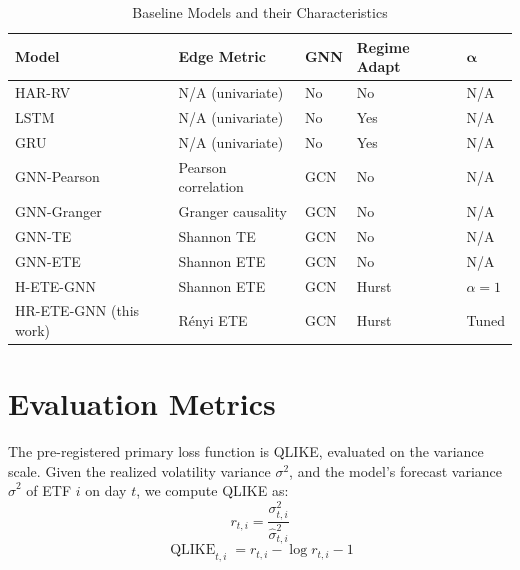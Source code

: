 \documentclass[12pt,oneside]{report}
\DeclareMathOperator{\QLIKE}{QLIKE}
\begin{document}
\begin{table}[htbp]
  \centering
  \singlespacing
  \caption{Baseline Models and their Characteristics}\label{tab:baselines}
  \small
  \begin{tabular}{lllll}
    \toprule
    \textbf{Model} & \textbf{Edge Metric} & \textbf{GNN} & \textbf{Regime Adapt} & $\boldsymbol{\alpha}$ \\
    \midrule
    HAR-RV                       & N/A (univariate)                     & No                  & No    & N/A \\
    LSTM \cite{hochreiter1997}   & N/A (univariate)                     & No                  & Yes   & N/A \\
    GRU \cite{cho2014}           & N/A (univariate)                     & No                  & Yes   & N/A \\
    GNN-Pearson                  & Pearson correlation                  & GCN \cite{kipf2017} & No    & N/A \\
    GNN-Granger                  & Granger causality \cite{granger1969} & GCN \cite{kipf2017} & No    & N/A \\
    GNN-TE                       & Shannon TE \cite{schreiber2000}      & GCN \cite{kipf2017} & No    & N/A \\
    GNN-ETE                      & Shannon ETE \cite{marschinski2002}   & GCN \cite{kipf2017} & No    & N/A \\
    H-ETE-GNN \cite{lee2025}     & Shannon ETE                          & GCN                 & Hurst & $\alpha = 1$ \\
    HR-ETE-GNN (this work)       & Rényi ETE                            & GCN                 & Hurst & Tuned \\
    \bottomrule
  \end{tabular}
\end{table}

\section{Evaluation Metrics}

The pre-registered primary loss function is QLIKE, evaluated on the
variance scale. Given the realized volatility variance $\sigma^{2}$, and
the model's forecast variance $\widehat{\sigma}^{2}$ of ETF $i$ on day
$t$, we compute QLIKE as:
\[
  r_{t,i} = \frac{\sigma_{t,i}^{2}}{\widehat{\sigma}_{t,i}^{2}}
\]
\[
  \QLIKE_{t,i} = r_{t,i} - \log r_{t,i} - 1
\]
\end{document}
